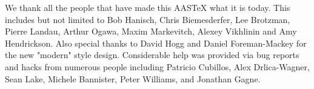 \documentclass[linenumbers]{aastex631}
\newcommand\aastex{AAS\TeX}
\begin{document}


\begin{acknowledgments}
We thank all the people that have made this AASTeX what it is today.  This
includes but not limited to Bob Hanisch, Chris Biemesderfer, Lee Brotzman,
Pierre Landau, Arthur Ogawa, Maxim Markevitch, Alexey Vikhlinin and Amy
Hendrickson. Also special thanks to David Hogg and Daniel Foreman-Mackey
for the new "modern" style design. Considerable help was provided via bug
reports and hacks from numerous people including Patricio Cubillos, Alex
Drlica-Wagner, Sean Lake, Michele Bannister, Peter Williams, and Jonathan
Gagne.
\end{acknowledgments}


{}

\end{document}
